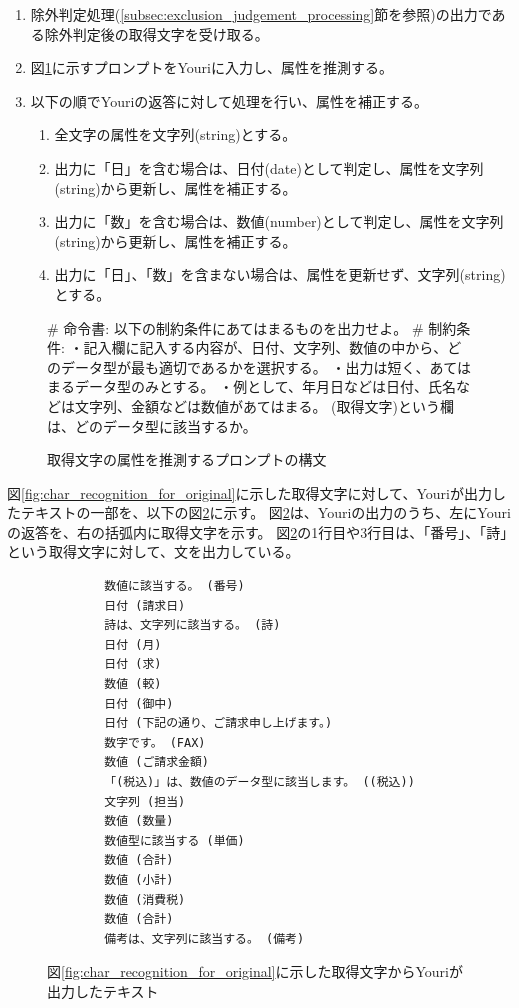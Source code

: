 \begin{enumerate}
    \item 除外判定処理(\ref{subsec:exclusion_judgement_processing}節を参照)の出力である除外判定後の取得文字を受け取る。
    \item 図\ref{fig:prompt_struct_for_attribute_prediction}に示すプロンプトをYouriに入力し、属性を推測する。
    \item 以下の順でYouriの返答に対して処理を行い、属性を補正する。
        \begin{enumerate}
            \item 全文字の属性を文字列(string)とする。
            \item 出力に「日」を含む場合は、日付(date)として判定し、属性を文字列(string)から更新し、属性を補正する。
            \item 出力に「数」を含む場合は、数値(number)として判定し、属性を文字列(string)から更新し、属性を補正する。
            \item 出力に「日」、「数」を含まない場合は、属性を更新せず、文字列(string)とする。
        \end{enumerate}
\end{enumerate}

\begin{figure}[hp]
    \vbox{
        \vbox{\# 命令書:}
        \vbox{以下の制約条件にあてはまるものを出力せよ。}
        \vbox{\# 制約条件:}
        \vbox{・記入欄に記入する内容が、日付、文字列、数値の中から、どのデータ型が最も適切であるかを選択する。}
        \vbox{・出力は短く、あてはまるデータ型のみとする。}
        \vbox{・例として、年月日などは日付、氏名などは文字列、金額などは数値があてはまる。}
        \vbox{(取得文字)という欄は、どのデータ型に該当するか。}
    }
    \centerline{}
    \caption{取得文字の属性を推測するプロンプトの構文}
    \label{fig:prompt_struct_for_attribute_prediction}
\end{figure}

図\ref{fig:char_recognition_for_original}に示した取得文字に対して、Youriが出力したテキストの一部を、以下の図\ref{fig:output_Youri}に示す。
図\ref{fig:output_Youri}は、Youriの出力のうち、左にYouriの返答を、右の括弧内に取得文字を示す。
図\ref{fig:output_Youri}の1行目や3行目は、「番号」、「詩」という取得文字に対して、文を出力している。

\lstset{language=}
\begin{figure}[t]
    \begin{lstlisting}
        数値に該当する。 (番号)
        日付 (請求日)
        詩は、文字列に該当する。 (詩)
        日付 (月)
        日付 (求)
        数値 (較)
        日付 (御中)
        日付 (下記の通り、ご請求申し上げます。)
        数字です。 (FAX)
        数値 (ご請求金額)
        「(税込)」は、数値のデータ型に該当します。 ((税込))
        文字列 (担当)
        数値 (数量)
        数値型に該当する (単価)
        数値 (合計)
        数値 (小計)
        数値 (消費税)
        数値 (合計)
        備考は、文字列に該当する。 (備考)
    \end{lstlisting}
    \caption{図\ref{fig:char_recognition_for_original}に示した取得文字からYouriが出力したテキスト}
    \label{fig:output_Youri}
\end{figure}

